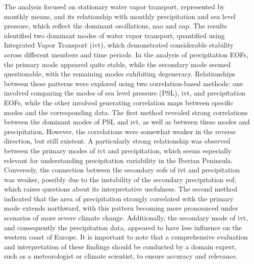 The analysis focused on stationary water vapor transport, represented by monthly means, and its relationship with monthly precipitation and sea level pressure, which reflect the dominant oscillations, \ac{nao} and \ac{eap}. 
The results identified two dominant modes of water vapor transport, quantified using Integrated Vapor Transport (\ac{ivt}), which demonstrated considerable stability across different members and time periods.
In the analysis of precipitation EOFs, the primary mode appeared quite stable, while the secondary mode seemed questionable, with the remaining modes exhibiting degeneracy. 
Relationships between these patterns were explored using two correlation-based methods: one involved comparing the modes of sea level pressure (PSL), \ac{ivt}, and precipitation EOFs, while the other involved generating correlation maps between specific modes and the corresponding data.
The first method revealed strong correlations between the dominant modes of PSL and \ac{ivt}, as well as between these modes and precipitation. 
However, the correlations were somewhat weaker in the reverse direction, but still existent. 
A particularly strong relationship was observed between the primary modes of \ac{ivt} and precipitation, which seems especially relevant for understanding precipitation variability in the Iberian Peninsula. 
Conversely, the connection between the secondary \acp{eof} of \ac{ivt} and precipitation was weaker, possibly due to the instability of the secondary precipitation \ac{eof}, which raises questions about its interpretative usefulness.
The second method indicated that the area of precipitation strongly correlated with the primary mode extends northward, with this pattern becoming more pronounced under scenarios of more severe climate change. 
Additionally, the secondary mode of \ac{ivt}, and consequently the precipitation data, appeared to have less influence on the western coast of Europe.
It is important to note that a comprehensive evaluation and interpretation of these findings should be conducted by a domain expert, such as a meteorologist or climate scientist, to ensure accuracy and relevance.

